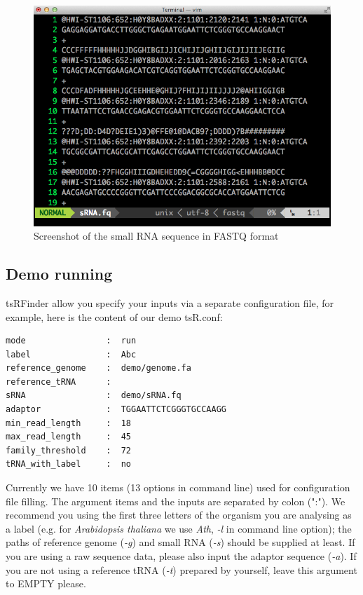 \documentclass[11pt, a4paper]{article}
\begin{document}
\begin{figure}[htbp]
\begin{center}
\includegraphics[width=12cm]{fastq.png}
\caption{Screenshot of the small RNA sequence in FASTQ format} 
\label{fastq}
\end{center}
\end{figure}

\subsection{Demo running}

tsRFinder allow you specify your inputs via a separate configuration file, for example, here is the content of our demo tsR.conf:

{\footnotesize \begin{tcolorbox}[colback=blue!5!white,colframe=blue!75!black,title=Demo configuration file for tsRFinder: demo/tsR.conf]
\begin{verbatim}
mode                :  run
label               :  Abc
reference_genome    :  demo/genome.fa 
reference_tRNA      :
sRNA                :  demo/sRNA.fq
adaptor             :  TGGAATTCTCGGGTGCCAAGG
min_read_length     :  18
max_read_length     :  45
family_threshold    :  72
tRNA_with_label     :  no
\end{verbatim}
\end{tcolorbox}}

Currently we have 10 items (13 options in command line) used for configuration file filling. The argument items and the inputs are separated by colon (":"). We recommend you using the first three letters of the organism you are analysing as a label (e.g. for \textit{Arabidopsis thaliana} we use \textit{Ath}, \emph{-l} in command line option); the paths of reference genome (\emph{-g}) and small RNA (\emph{-s}) should be supplied at least. If you are using a raw sequence data, please also input the adaptor sequence (\emph{-a}). If you are not using a reference tRNA (\emph{-t}) prepared by yourself, leave this argument to EMPTY please.
\end{document}
